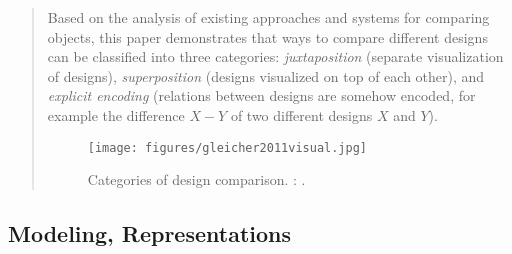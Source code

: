 		\begin{quote}
		\small
		Based on the analysis of existing approaches and systems for comparing objects,
		this paper demonstrates that ways to compare different designs can be classified into
		three categories: 
		{\em juxtaposition} (separate visualization of designs),
		{\em superposition} (designs visualized on top of each other), and
		{\em explicit encoding} (relations between designs are somehow encoded, for example
		the difference $X - Y$ of two different designs $X$ and $Y$).
		
		\begin{figure}[htb]
		\begin{center}
		\texttt{[image: figures/gleicher2011visual.jpg]}
		\caption{
		Categories of design comparison.  
		\citeauthor{gleicher2011visual}: 
		\cite{gleicher2011visual}.}
		\label{fig:gleicher2011visual}
		\end{center}
		\end{figure}
		
		\end{quote}




\subsection{Modeling, Representations} 

